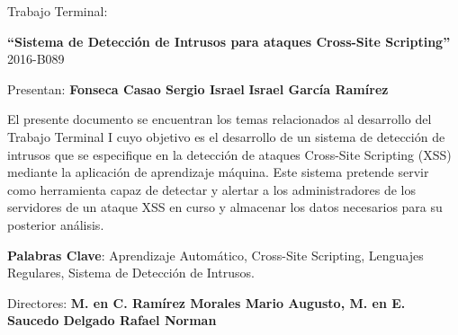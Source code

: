 \begin{titlepage}
\vspace{1.5cm}
\begin{center}
\large Trabajo Terminal: \linebreak

\large \textbf{``Sistema de Detección de Intrusos para ataques Cross-Site Scripting''} \linebreak
\large 2016-B089

\end{center}

\vspace{1.5cm}

\begin{center}
Presentan: \linebreak
\textbf{Fonseca Casao Sergio Israel} \linebreak
\textbf{Israel García Ramírez} \linebreak
\end{center}

\vspace{1.5cm}

El presente documento se encuentran los temas relacionados al desarrollo del Trabajo Terminal I cuyo objetivo es el desarrollo de un sistema de detección de intrusos que se especifique en la detección de ataques Cross-Site Scripting (XSS) mediante la aplicación de aprendizaje máquina. Este sistema pretende servir como herramienta capaz de detectar y alertar a los administradores de los servidores de un ataque XSS en curso y almacenar los datos necesarios para su posterior análisis.\linebreak

\textbf{Palabras Clave}:  Aprendizaje Automático, Cross-Site Scripting, Lenguajes Regulares, Sistema de Detección de Intrusos.

\vspace{1.5cm}
 
\begin{center}


Directores: \linebreak
\textbf{ M. en C. Ramírez Morales Mario Augusto, M. en E. Saucedo Delgado Rafael Norman}

\end{center}





\end{titlepage}
